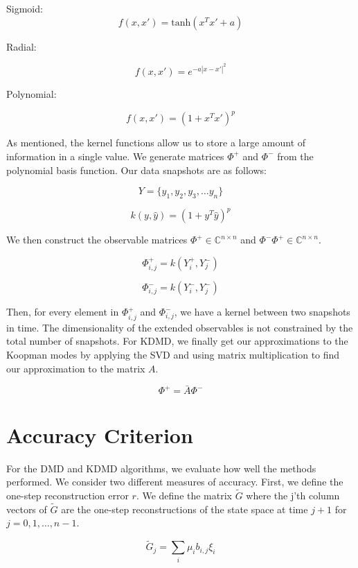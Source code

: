 \noindent Sigmoid:
$$
f(x,x') = \text{tanh}(x^Tx' + a)
$$

\vspace{3mm}

\noindent Radial: 

$$
f(x,x') = e^{-a|x-x'|^2}
$$

\vspace{3mm}


\noindent Polynomial:

$$
f(x,x') = (1 + x^Tx')^p
$$

\vspace{3mm}

As mentioned, the kernel functions allow us to store a large amount of information in a single value. We generate matrices
$\Phi^+$ and $\Phi^-$ from the polynomial basis function. Our data snapshots are as
follows:

$$
 Y = \{y_1,y_2,y_3, \dots y_n\}
$$

$$
k (y,{\hat y}) = (1 + y^T {\hat y})^p
$$

\noindent We then construct the observable matrices $\Phi^{+}\in \mathbb{C}^{n \times n}$ and $ \Phi^{-}\Phi^{+}\in \mathbb{C}^{n \times n}$.

$$
\Phi^{+}_{i,j} = k(Y^{+}_{i}, Y^{-}_j)
$$

$$
\Phi^{-}_{i,j} = k(Y^{-}_{i}, Y^{-}_j)
$$

\noindent Then, for every element in $\Phi^{+}_{i,j}$ and $\Phi^{-}_{i,j}$, we have a kernel between two snapshots in time. The dimensionality of the
extended observables is not constrained by the total number of snapshots. For KDMD, we finally get
our approximations to the Koopman modes by applying the SVD and using matrix multiplication to find our approximation to the matrix $A$.

$$
\Phi^{+} = {\bar A} \Phi^{-}
$$

\section{Accuracy Criterion}
For the DMD and KDMD algorithms, we evaluate how
well the methods performed. We consider two different measures
of accuracy. First, we define the one-step reconstruction
error $r$. We define the matrix ${\tilde G}$ where the j'th column vectors of ${\tilde G}$ are the one-step
reconstructions of the state space at time $j+1$ for $j=0,1,\dots, n-1$.

$$
{\tilde G}_{j} = \sum_{i} \mu_i b_{i,j} \xi_i
$$


